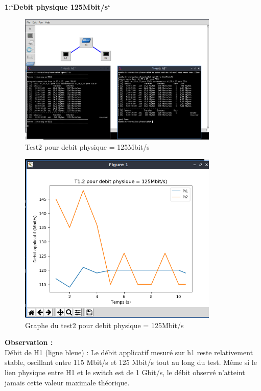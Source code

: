\newpage
\textbf{1:`Debit physique 125Mbit/s`} 
\begin{figure}[H]
    \centering
    \includegraphics[width=0.85\textwidth]{./images/T1.2/125test2.png}
    \caption{Test2 pour debit physique = 125Mbit/s}
    \label{fig:exemple}
\end{figure}
\begin{figure}[H]
    \centering
    \includegraphics[width=0.85\textwidth]{./images/T1.2/courbe125test2.png}
    \caption{Graphe du test2 pour debit physique = 125Mbit/s}
    \label{fig:exemple}
\end{figure}

\textbf{Observation :}\\
Débit de H1 (ligne bleue) : Le débit applicatif mesuré sur h1 reste relativement stable, oscillant entre 115 Mbit/s et 125 Mbit/s tout au long du test. Même si le lien physique entre H1 et le switch est de 1 Gbit/s, le débit observé n’atteint jamais cette valeur maximale théorique.


